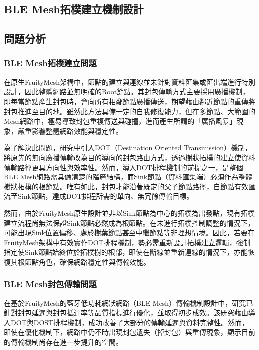 \begin{ZhChapter}

\chapter{BLE Mesh拓樸建立機制設計}

\section{問題分析}

\subsection{BLE Mesh拓樸建立問題}

在原生FruityMesh架構中，節點的建立與連線並未針對資料匯集或匯出端進行特別設計，因此整體網路並無明確的Root節點。其封包傳輸方式主要採用廣播機制，即每當節點產生封包時，會向所有相鄰節點廣播傳送，期望藉由鄰近節點的重傳將封包推進至目的地。雖然此方法具備一定的自我修復能力，但在多節點、大範圍的Mesh網路中，極易導致封包重複傳送與碰撞，進而產生所謂的「廣播風暴」現象，嚴重影響整體網路效能與穩定性。

為了解決此問題，研究中引入DOT（Destination Oriented Transmission）機制\cite{112TIT00392032}，將原先的無向廣播傳輸改為目的導向的封包路由方式，透過樹狀拓樸的建立使資料傳輸路徑更具方向性與效率性。然而，導入DOT排程機制的前提之一，是整個BLE Mesh網路需具備清楚的階層結構，而Sink節點（資料匯集端）必須作為整體樹狀拓樸的根節點。唯有如此，封包才能沿著既定的父子節點路徑，自節點有效匯流至Sink節點，達成DOT排程所需的單向、無冗餘傳輸目標。

然而，由於FruityMesh原生設計並非以Sink節點為中心的拓樸為出發點，現有拓樸建立流程尚無法保證Sink節點必然成為根節點。在未進行拓樸控制調整的情況下，可能出現Sink位置偏移、處於樹葉節點甚至中繼節點等非理想情境。因此，若要在FruityMesh架構中有效實作DOT排程機制，勢必需重新設計拓樸建立邏輯，強制指定使Sink節點始終位於拓樸樹的根部，即使在斷線並重新連線的情況下，亦能恢復其根節點角色，確保網路穩定性與傳輸效能。

\subsection{BLE Mesh封包傳輸問題}

在基於FruityMesh的藍牙低功耗網狀網路（BLE Mesh）傳輸機制設計中，\cite{112TIT00392032}研究已針對封包延遲與封包抵達率等品質指標進行優化，並取得初步成效。該研究藉由導入DOT與DOST排程機制，成功改善了大部分的傳輸延遲與資料完整性。然而，即使在優化機制下，網路中仍不時出現封包遺失（掉封包）與重傳現象，顯示目前的傳輸機制尚存在進一步提升的空間。


\end{ZhChapter}
